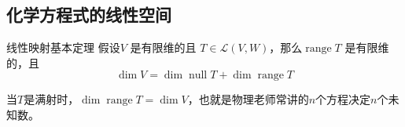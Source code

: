 \documentclass{ctexart}
\DeclareMathOperator{\nullspace}{null}
\DeclareMathOperator{\range}{range}
\renewcommand{\L}{\mathscr{L}}
\begin{document}
\subsection{化学方程式的线性空间}

\begin{theorem}{线性映射基本定理}
    假设\(V\) 是有限维的且 \(T \in \L(V,W)\)，那么\(\range
    T\) 是有限维的，且\[
        \dim V = \dim \nullspace T + \dim \range T
    \]
\end{theorem}

当\(T\)是满射时，\(\dim \range T = \dim V\)，也就是物理老师常讲的\(n\)个方程决定\(n\)个未知数。
\end{document}
